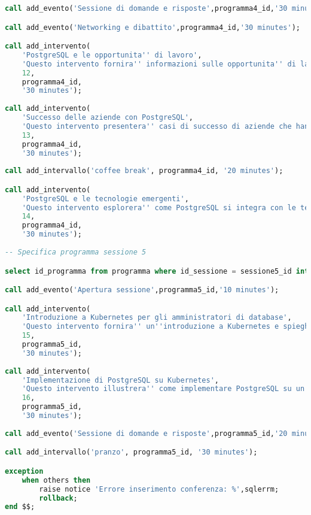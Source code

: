 \begin{lstlisting}[language=SQL, style=mystyle,caption={Conferenza PGConf NPL}]
call add_evento('Sessione di domande e risposte',programma4_id,'30 minutes');

call add_evento('Networking e dibattito',programma4_id,'30 minutes');

call add_intervento(
    'PostgreSQL e le opportunita'' di lavoro',
    'Questo intervento fornira'' informazioni sulle opportunita'' di lavoro e carriera legate all''esperienza con PostgreSQL, inclusi i ruoli professionali, le competenze richieste e le tendenze del mercato.',
    12,
    programma4_id,
    '30 minutes');
    
call add_intervento(
    'Successo delle aziende con PostgreSQL',
    'Questo intervento presentera'' casi di successo di aziende che hanno adottato PostgreSQL come database principale e i benefici che hanno ottenuto.',
    13,
    programma4_id,
    '30 minutes');
    
call add_intervallo('coffee break', programma4_id, '20 minutes');

call add_intervento(
    'PostgreSQL e le tecnologie emergenti',
    'Questo intervento esplorera'' come PostgreSQL si integra con le tecnologie emergenti, come l''intelligenza artificiale, l''Internet of Things (IoT) e l''analisi dei big data.',
    14,
    programma4_id,
    '30 minutes');
    
-- Specifica programma sessione 5

select id_programma from programma where id_sessione = sessione5_id into programma5_id;

call add_evento('Apertura sessione',programma5_id,'10 minutes');

call add_intervento(
    'Introduzione a Kubernetes per gli amministratori di database',
    'Questo intervento fornira'' un''introduzione a Kubernetes e spieghera'' come gli amministratori di database possono utilizzare questa piattaforma per orchestrare e gestire il deployment di istanze di PostgreSQL.',
    15,
    programma5_id,
    '30 minutes');
    
call add_intervento(
    'Implementazione di PostgreSQL su Kubernetes',
    'Questo intervento illustrera'' come implementare PostgreSQL su un cluster Kubernetes, fornendo linee guida e best practice per il deployment, la scalabilita'' e la gestione delle istanze di PostgreSQL.',
    16,
    programma5_id,
    '30 minutes');
    
call add_evento('Sessione di domande e risposte',programma5_id,'20 minutes');

call add_intervallo('pranzo', programma5_id, '30 minutes');

exception
    when others then
        raise notice 'Errore inserimento conferenza: %',sqlerrm;
        rollback;
end $$;
\end{lstlisting}